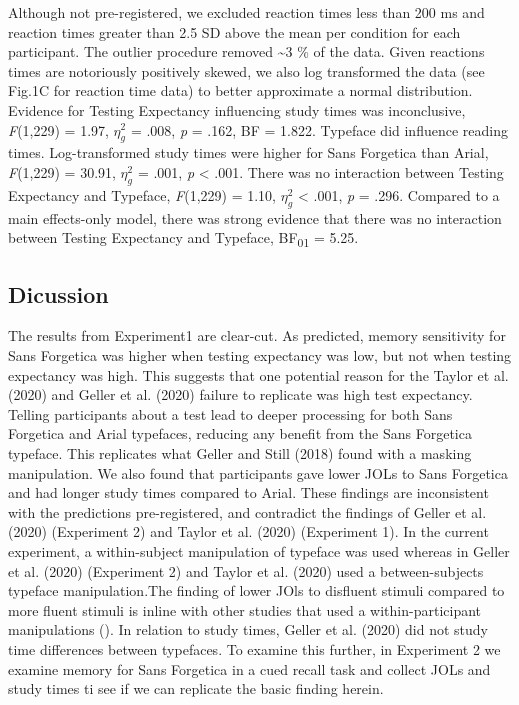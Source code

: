\documentclass[
  english,
  man]{apa6}
\begin{document}
Although not pre-registered, we excluded reaction times less than 200 ms and reaction times greater than 2.5 SD above the mean per condition for each participant. The outlier procedure removed \textasciitilde3 \% of the data. Given reactions times are notoriously positively skewed, we also log transformed the data (see Fig.1C for reaction time data) to better approximate a normal distribution. Evidence for Testing Expectancy influencing study times was inconclusive, \emph{F}(1,229) = 1.97, \(\eta_{g}^{2}\) = .008, \emph{p} = .162, BF = 1.822. Typeface did influence reading times. Log-transformed study times were higher for Sans Forgetica than Arial, \emph{F}(1,229) = 30.91, \(\eta_{g}^{2}\) = .001, \emph{p} \textless{} .001. There was no interaction between Testing Expectancy and Typeface, \emph{F}(1,229) = 1.10, \(\eta_{g}^{2}\) \textless{} .001, \emph{p} = .296. Compared to a main effects-only model, there was strong evidence that there was no interaction between Testing Expectancy and Typeface, BF\textsubscript{01} = 5.25.

\hypertarget{dicussion}{%
\subsection{Dicussion}\label{dicussion}}

The results from Experiment1 are clear-cut. As predicted, memory sensitivity for Sans Forgetica was higher when testing expectancy was low, but not when testing expectancy was high. This suggests that one potential reason for the Taylor et al. (2020) and Geller et al. (2020) failure to replicate was high test expectancy. Telling participants about a test lead to deeper processing for both Sans Forgetica and Arial typefaces, reducing any benefit from the Sans Forgetica typeface. This replicates what Geller and Still (2018) found with a masking manipulation. We also found that participants gave lower JOLs to Sans Forgetica and had longer study times compared to Arial. These findings are inconsistent with the predictions pre-registered, and contradict the findings of Geller et al. (2020) (Experiment 2) and Taylor et al. (2020) (Experiment 1). In the current experiment, a within-subject manipulation of typeface was used whereas in Geller et al. (2020) (Experiment 2) and Taylor et al. (2020) used a between-subjects typeface manipulation.The finding of lower JOls to disfluent stimuli compared to more fluent stimuli is inline with other studies that used a within-participant manipulations (). In relation to study times, Geller et al. (2020) did not study time differences between typefaces. To examine this further, in Experiment 2 we examine memory for Sans Forgetica in a cued recall task and collect JOLs and study times ti see if we can replicate the basic finding herein.
\end{document}
